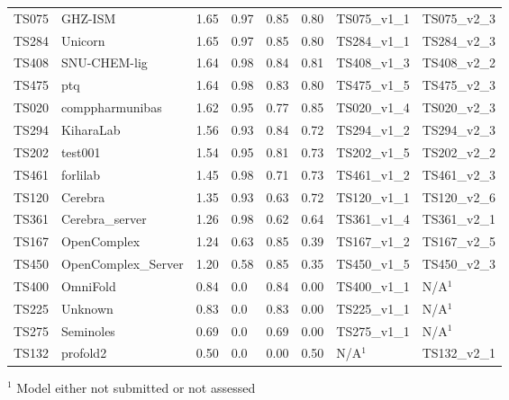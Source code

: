 \begin{table}[ht]
{\begin{tabular}{llllllll}
TS075 & GHZ-ISM & 1.65 & 0.97 & 0.85 & 0.80 & TS075\_v1\_1 & TS075\_v2\_3 \\ 
TS284 & Unicorn & 1.65 & 0.97 & 0.85 & 0.80 & TS284\_v1\_1 & TS284\_v2\_3 \\ 
TS408 & SNU-CHEM-lig & 1.64 & 0.98 & 0.84 & 0.81 & TS408\_v1\_3 & TS408\_v2\_2 \\ 
TS475 & ptq & 1.64 & 0.98 & 0.83 & 0.80 & TS475\_v1\_5 & TS475\_v2\_3 \\ 
TS020 & comppharmunibas & 1.62 & 0.95 & 0.77 & 0.85 & TS020\_v1\_4 & TS020\_v2\_3 \\ 
TS294 & KiharaLab & 1.56 & 0.93 & 0.84 & 0.72 & TS294\_v1\_2 & TS294\_v2\_3 \\ 
TS202 & test001 & 1.54 & 0.95 & 0.81 & 0.73 & TS202\_v1\_5 & TS202\_v2\_2 \\ 
TS461 & forlilab & 1.45 & 0.98 & 0.71 & 0.73 & TS461\_v1\_2 & TS461\_v2\_3 \\ 
TS120 & Cerebra & 1.35 & 0.93 & 0.63 & 0.72 & TS120\_v1\_1 & TS120\_v2\_6 \\ 
TS361 & Cerebra\_server & 1.26 & 0.98 & 0.62 & 0.64 & TS361\_v1\_4 & TS361\_v2\_1 \\ 
TS167 & OpenComplex & 1.24 & 0.63 & 0.85 & 0.39 & TS167\_v1\_2 & TS167\_v2\_5 \\ 
TS450 & OpenComplex\_Server & 1.20 & 0.58 & 0.85 & 0.35 & TS450\_v1\_5 & TS450\_v2\_3 \\ 
TS400 & OmniFold & 0.84 & 0.0 & 0.84 & 0.00 & TS400\_v1\_1 & N/A$^{1}$ \\ 
TS225 & Unknown & 0.83 & 0.0 & 0.83 & 0.00 & TS225\_v1\_1 & N/A$^{1}$ \\ 
TS275 & Seminoles & 0.69 & 0.0 & 0.69 & 0.00 & TS275\_v1\_1 & N/A$^{1}$ \\ 
TS132 & profold2 & 0.50 & 0.0 & 0.00 & 0.50 & N/A$^{1}$ & TS132\_v2\_1 \\ 
\bottomrule
\end{tabular}%
}
\begin{flushleft}\footnotesize $^{1}$ Model either not submitted or not assessed\end{flushleft}
\end{table}
